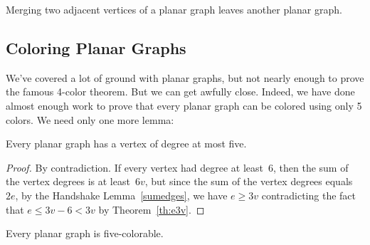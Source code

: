 \begin{theorem}\label{mergelem}
Merging two adjacent vertices of a planar graph leaves another planar
graph.
\end{theorem}

\subsection{Coloring Planar Graphs}

We've covered a lot of ground with planar graphs, but not nearly
enough to prove the famous 4-color theorem.  But we can get awfully
close.  Indeed, we have done almost enough work to prove that every
planar graph can be colored using only 5 colors.  We need only one
more lemma:
\begin{lemma}\label{lem:pg5}
Every planar graph has a vertex of degree at most five.
\end{lemma}

\begin{proof}
By contradiction.
If every vertex had degree at least~6, then the sum of the vertex
degrees is at least~$6v$, but since the sum of the vertex degrees
equals~$2e$, by the Handshake Lemma~\ref{sumedges}, we have $e
\ge 3v$ contradicting the fact that $e \le 3v - 6 < 3v$ by
Theorem~\ref{th:e3v}.
\end{proof}

\begin{theorem}
Every planar graph is five-colorable.
\end{theorem}

